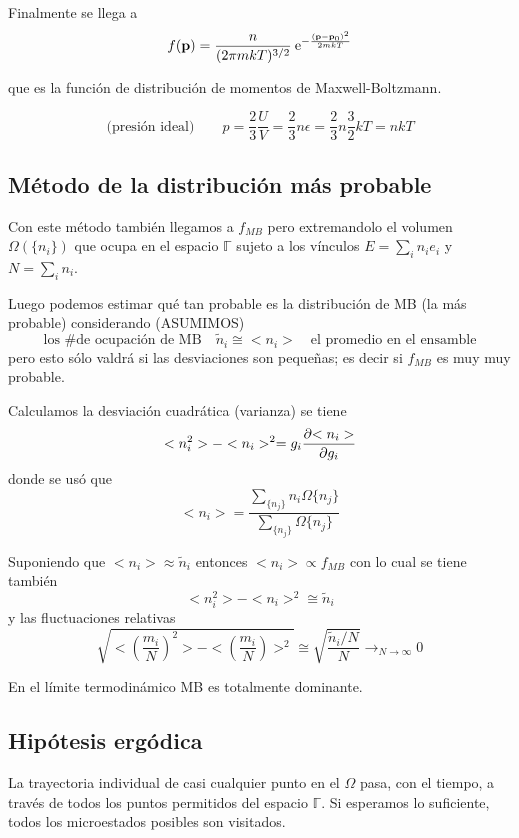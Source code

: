 \documentclass[10pt,oneside]{CBFT_book}
\begin{document}
Finalmente se llega a 
\[
	f(\vb{p}) = \frac{n}{(2\pi m k T)^{3/2}} \euler^{- \frac{( \vb{p} - \vb{p}_0 )^2}{2mkT} }
\]

que es la función de distribución de momentos de Maxwell-Boltzmann.

\[
	\text{(presión ideal)} \qquad p = \frac{2}{3} \frac{U}{V} = \frac{2}{3} n \epsilon =
	\frac{2}{3} n \frac{3}{2} k T = nkT 
\]

\subsection{Método de la distribución más probable}

Con este método también llegamos a $f_{MB}$ pero extremandolo el volumen $\Omega(\{ n_i \})$ que ocupa en el espacio
$\mathbb{\Gamma}$ sujeto a los vínculos $E = \sum_i n_i e_i$ y $N = \sum_i n_i $.

Luego podemos estimar qué tan probable es la distribución de MB (la más probable) considerando
(ASUMIMOS)
\[
	\text{los \# de ocupación de MB} \quad \tilde{n}_i \cong <n_i> \quad \text{el promedio en el ensamble}
\]
pero esto sólo valdrá si las desviaciones son pequeñas; es decir si $f_{MB}$ es muy muy probable.

Calculamos la desviación cuadrática (varianza) se tiene 
\[
	<n_i^2> - <n_i>^2 = g_i \frac{\partial^{\hspace{-0.05em}} {<n_i>}}{\partial {g_i}^{\hspace{-0.05em}}}
\]
donde se usó que 
\[
	<n_i> = \frac{\sum_{\{ n_j\}} n_i \Omega\{ n_j\} }{\sum_{\{ n_j\}} \Omega\{ n_j\}}
\]

Suponiendo que $ <n_i> \approx \tilde{n}_i$ entonces $ <n_i>  \propto f_{MB}$ con lo cual se tiene también 
\[
	<n_i^2> - <n_i>^2 \cong \tilde{n}_i
\]
y las fluctuaciones relativas
\[
	\sqrt{<\left( \frac{m_i}{N}\right)^2 > - <\left( \frac{m_i}{N}\right) >^2 } \cong 
	\sqrt{ \frac{ \tilde{n}_i/N }{N} }\to_{N\to\infty} 0
\]

En el límite termodinámico MB es totalmente dominante.

\subsection{Hipótesis ergódica}

La trayectoria individual de casi cualquier punto en el $\Omega$ pasa, con el tiempo, a través de todos los
puntos permitidos del espacio $\mathbb{\Gamma}$. Si esperamos lo suficiente, todos los microestados posibles
son visitados.
\end{document}

